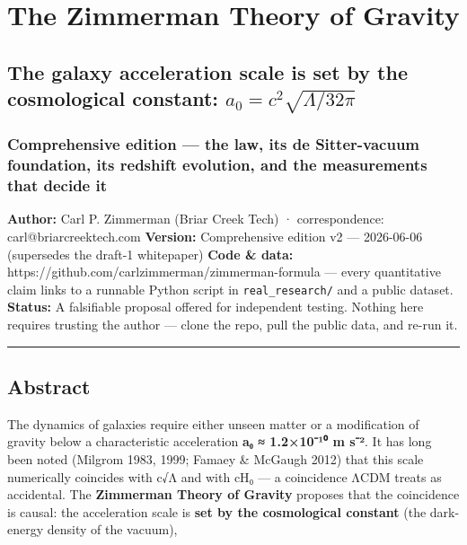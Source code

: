 \documentclass[
]{article}
\author{}
\date{}
\begin{document}
\section{The Zimmerman Theory of
Gravity}\label{the-zimmerman-theory-of-gravity}

\subsection{\texorpdfstring{The galaxy acceleration scale is set by the
cosmological constant:
\(a_0 = c^2\sqrt{\Lambda/32\pi}\)}{The galaxy acceleration scale is set by the cosmological constant: a\_0 = c\^{}2\textbackslash sqrt\{\textbackslash Lambda/32\textbackslash pi\}}}\label{the-galaxy-acceleration-scale-is-set-by-the-cosmological-constant-a_0-c2sqrtlambda32pi}

\subsubsection{Comprehensive edition --- the law, its de Sitter-vacuum
foundation, its redshift evolution, and the measurements that decide
it}\label{comprehensive-edition-the-law-its-de-sitter-vacuum-foundation-its-redshift-evolution-and-the-measurements-that-decide-it}

\textbf{Author:} Carl P. Zimmerman (Briar Creek Tech) · correspondence:
carl@briarcreektech.com \textbf{Version:} Comprehensive edition v2 ---
2026-06-06 (supersedes the draft-1 whitepaper) \textbf{Code \& data:}
https://github.com/carlzimmerman/zimmerman-formula --- every
quantitative claim links to a runnable Python script in
\texttt{real\_research/} and a public dataset. \textbf{Status:} A
falsifiable proposal offered for independent testing. Nothing here
requires trusting the author --- clone the repo, pull the public data,
and re-run it.

\begin{center}\rule{0.5\linewidth}{0.5pt}\end{center}

\subsection{Abstract}\label{abstract}

The dynamics of galaxies require either unseen matter or a modification
of gravity below a characteristic acceleration \textbf{a₀ ≈ 1.2×10⁻¹⁰ m
s⁻²}. It has long been noted (Milgrom 1983, 1999; Famaey \& McGaugh
2012) that this scale numerically coincides with c√Λ and with cH₀ --- a
coincidence ΛCDM treats as accidental. The \textbf{Zimmerman Theory of
Gravity} proposes that the coincidence is causal: the acceleration scale
is \textbf{set by the cosmological constant} (the dark-energy density of
the vacuum),
\end{document}

